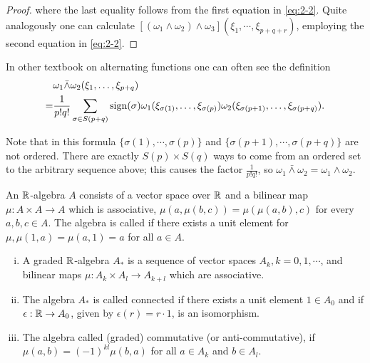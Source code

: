 \begin{proof}
  where the last equality follows from the first equation in \eqref{eq:2-2}. Quite analogously one can calculate
  $[(\omega_1\wedge\omega_2)\wedge\omega_3](\xi_1, \cdots, \xi_{p+q+r})$, employing the second equation in \eqref{eq:2-2}.
\end{proof}

\begin{remark}\label{remark:2-10}
In other textbook on alternating functions one can often see the definition
\begin{align*}
    & \omega_{1}\bar{\wedge}\omega_{2}(\xi_{1},\ldots,\xi_{p+q})\\
  = & \frac{1}{p!q!}\sum_{\sigma\in S(p+q)}\operatorname{sign}(\sigma)
      \omega_{1}(\xi_{\sigma(1)},\ldots,\xi_{\sigma(p)})
      \omega_{2}(\xi_{\sigma(p+1)},\ldots,\xi_{\sigma(p+q)}).
\end{align*}

Note that in this formula $\{\sigma(1), \cdots,\sigma(p)\}$ and $\{\sigma(p + 1), \cdots, \sigma(p + q)\}$ are not
ordered. There are exactly $S(p)\times S(q)$ ways to come from an ordered set to the arbitrary sequence above; 
this causes the factor $\frac{1}{p!q!}$, so $\omega_1\bar{\wedge}\omega_2 = \omega_1\wedge\omega_2$.
\end{remark}

An $\mathbb{R}$-algebra $A$ consists of a vector space over $\mathbb{R}$ and a bilinear map $\mu:A\times A\to A$
which is associative, $\mu(a, \mu(b,c)) = \mu(\mu(a, b), c)$ for every $a,b,c \in A$. The
algebra is called  if there exists a unit element for $\mu, \mu(1, a) = \mu( a, 1) = a$
for all $a\in A$.

\begin{definition}\label{def:2-11}\;\par
  \begin{enumerate}[(i)]
    \item A graded $\mathbb{R}$-algebra $A_*$ is a sequence of vector spaces $A_k, k = 0,1, \cdots$,
      and bilinear maps $\mu:A_k\times A_l\to A_{k+l}$ which are associative.
    \item The algebra $A_*$ is called connected if there exists a unit element $1\in A_0$ and 
      if $\epsilon:\mathbb{R}\to A_0$, given by $\epsilon(r) = r\cdot 1$, is an isomorphism.
    \item The algebra called (graded) commutative (or anti-commutative), if $\mu(a, b) = (-1)^{kl}\mu(b, a)$
      for all $a\in A_k$ and $b\in A_l$.
  \end{enumerate}
\end{definition}


